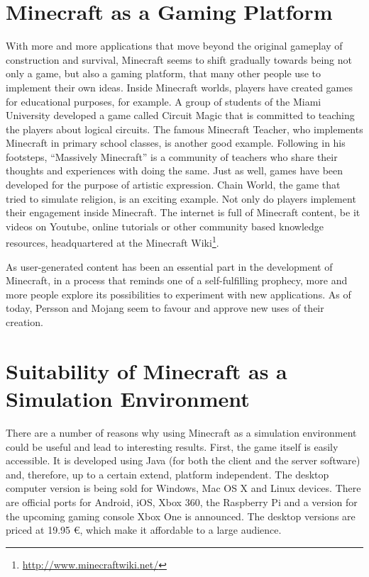     \section{Minecraft as a Gaming Platform}
With more and more applications that move beyond the original gameplay of construction and survival, Minecraft seems to shift gradually towards being not only a game, but also a gaming platform, that many other people use to implement their own ideas. Inside Minecraft worlds, players have created games for educational purposes, for example. A group of students of the Miami University developed a game called Circuit Magic that is committed to teaching the players about logical circuits. The famous Minecraft Teacher, who implements Minecraft in primary school classes, is another good example. Following in his footsteps, ``Massively Minecraft'' is a community of teachers who share their thoughts and experiences with doing the same. Just as well, games have been developed for the purpose of artistic expression. Chain World, the game that tried to simulate religion, is an exciting example. Not only do players implement their engagement inside Minecraft. The internet is full of Minecraft content, be it videos on Youtube, online tutorials or other community based knowledge resources, headquartered at the Minecraft Wiki\footnote{\url{http://www.minecraftwiki.net/}}.~\cite{Duncan:2011:MBC:2207096.2207097}

As user-generated content has been an essential part in the development of Minecraft, in a process that reminds one of a self-fulfilling prophecy, more and more people explore its possibilities to experiment with new applications. As of today, Persson and Mojang seem to favour and approve new uses of their creation.~\cite{Duncan:2011:MBC:2207096.2207097}

    \section{Suitability of Minecraft as a Simulation Environment}
There are a number of reasons why using Minecraft as a simulation environment could be useful and lead to interesting results. First, the game itself is easily accessible. It is developed using Java (for both the client and the server software) and, therefore, up to a certain extend, platform independent. The desktop computer version is being sold for Windows, Mac OS X and Linux devices. There are official ports for Android, iOS, Xbox 360, the Raspberry Pi and a version for the upcoming gaming console Xbox One is announced. The desktop versions are priced at 19.95 \euro, which make it affordable to a large audience.

